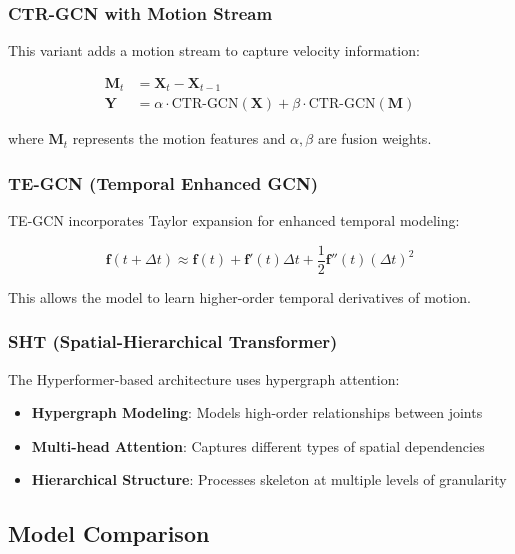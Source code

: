 \documentclass[11pt,a4paper]{article}
\begin{document}
\subsubsection{CTR-GCN with Motion Stream}

This variant adds a motion stream to capture velocity information:

\begin{align}
\mathbf{M}_t &= \mathbf{X}_t - \mathbf{X}_{t-1} \\
\mathbf{Y} &= \alpha \cdot \text{CTR-GCN}(\mathbf{X}) + \beta \cdot \text{CTR-GCN}(\mathbf{M})
\end{align}

where $\mathbf{M}_t$ represents the motion features and $\alpha, \beta$ are fusion weights.

\subsubsection{TE-GCN (Temporal Enhanced GCN)}

TE-GCN incorporates Taylor expansion for enhanced temporal modeling:

\begin{equation}
\mathbf{f}(t+\Delta t) \approx \mathbf{f}(t) + \mathbf{f}'(t)\Delta t + \frac{1}{2}\mathbf{f}''(t)(\Delta t)^2
\end{equation}

This allows the model to learn higher-order temporal derivatives of motion.

\subsubsection{SHT (Spatial-Hierarchical Transformer)}

The Hyperformer-based architecture uses hypergraph attention:

\begin{itemize}
    \item \textbf{Hypergraph Modeling}: Models high-order relationships between joints
    \item \textbf{Multi-head Attention}: Captures different types of spatial dependencies
    \item \textbf{Hierarchical Structure}: Processes skeleton at multiple levels of granularity
\end{itemize}

\subsection{Model Comparison}
\end{document}
